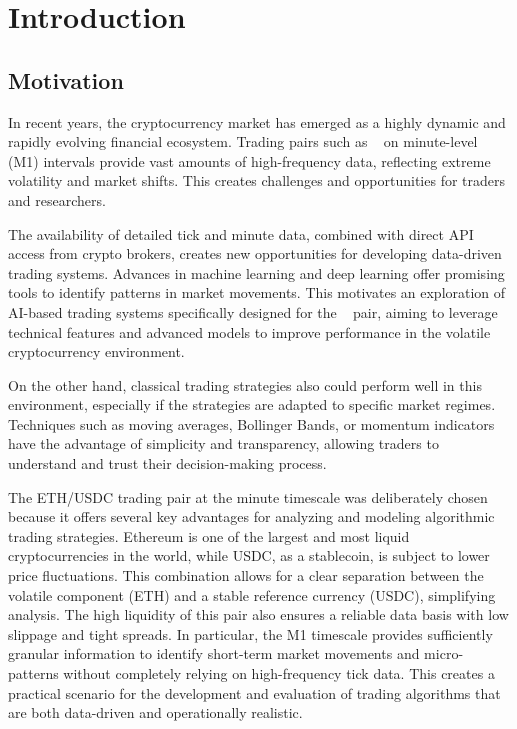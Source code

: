 \section{Introduction}

\subsection{Motivation}

In recent years, the cryptocurrency market has emerged as a highly dynamic and rapidly evolving financial ecosystem.
Trading pairs such as \ethusdc~ on minute-level (M1) intervals provide vast amounts of high-frequency data, reflecting extreme volatility and market shifts.
This creates challenges and opportunities for traders and researchers.

The availability of detailed tick and minute data, combined with direct API access from crypto brokers, creates new opportunities for developing data-driven trading systems.
Advances in machine learning and deep learning offer promising tools to identify patterns in market movements.
This motivates an exploration of AI-based trading systems specifically designed for the \ethusdc~ pair, aiming to leverage technical features and advanced models to improve performance in the volatile cryptocurrency environment.

On the other hand, classical trading strategies also could perform well in this environment, especially if the strategies are adapted to specific market regimes.
Techniques such as moving averages, Bollinger Bands, or momentum indicators have the advantage of simplicity and transparency, allowing traders to understand and trust their decision-making process.

The ETH/USDC trading pair at the minute timescale was deliberately chosen because it offers several key advantages for analyzing and modeling algorithmic trading strategies.
Ethereum is one of the largest and most liquid cryptocurrencies in the world, while USDC, as a stablecoin, is subject to lower price fluctuations.
This combination allows for a clear separation between the volatile component (ETH) and a stable reference currency (USDC), simplifying analysis.
The high liquidity of this pair also ensures a reliable data basis with low slippage and tight spreads.
In particular, the M1 timescale provides sufficiently granular information to identify short-term market movements and micro-patterns without completely relying on high-frequency tick data.
This creates a practical scenario for the development and evaluation of trading algorithms that are both data-driven and operationally realistic.


